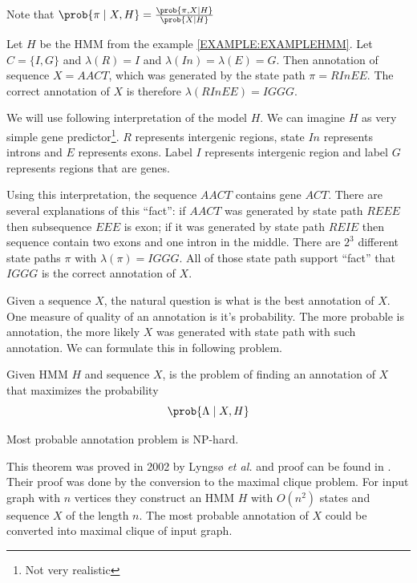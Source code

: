 Note that $\prob{\pi\mid X,H}=\frac{\prob{\pi,X\mid H}}{\prob{X\mid
H}}$

\begin{example}\label{EXAMPLE:ANNOTATION}
Let $H$ be the HMM from the example \ref{EXAMPLE:EXAMPLEHMM}. Let $C=\{I,G\}$ and
$\lambda(R)=I$ and $\lambda(In)=\lambda(E)=G$.  Then annotation of sequence
$X=AACT$, which was generated by the state path $\pi=RInEE$. The correct
annotation of $X$ is therefore  $\lambda(RInEE) =
IGGG$. 

We will use following interpretation of the model $H$. We can imagine $H$ as very simple gene
predictor\footnote{Not very realistic}. $R$ represents intergenic regions, state $In$
represents introns and $E$ represents exons. Label $I$ represents
intergenic region and label $G$ represents regions that are genes.

Using this interpretation, the sequence $AACT$ contains gene $ACT$. There are
several explanations of this ``fact'': if $AACT$ was generated by state path
$REEE$ then subsequence $EEE$ is exon; if it was generated by state path $REIE$
then sequence contain two exons and one intron in the middle. There are $2^3$
different state paths $\pi$ with $\lambda(\pi)=IGGG$.  All of those state path
support ``fact'' that $IGGG$ is the correct annotation of $X$.

\end{example}



Given a sequence $X$, the natural question is what is the best annotation of
$X$.  One measure of quality of an annotation is it's probability. The more
probable is annotation, the more likely $X$ was generated with state path with
such annotation. We can formulate this in following problem.

\begin{definition}
Given HMM $H$ and sequence $X$,  is the problem of finding an annotation of $X$ that maximizes
the probability \[\prob{\Lambda\mid X,H}\]
\end{definition}

\begin{theorem}
Most probable annotation problem is NP-hard.
\end{theorem}
This theorem was proved in 2002 by Lyngsø {\it et al.} and proof can be found in
\cite{Lyngso2002}. Their proof was done by the  conversion to the maximal clique problem.
For input graph with $n$ vertices they construct an HMM $H$ with $O(n^2)$ states and
sequence $X$ of the length $n$. The most probable annotation of $X$ could be
converted into maximal clique of input graph. 

